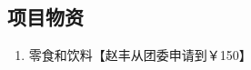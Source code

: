 \documentclass[12pt]{ctexart}
\begin{document}
\begin{appendix}
\section{项目物资}\label{scheduling}
\begin{enumerate}
\item 零食和饮料【赵丰从团委申请到￥150】
\end{enumerate}


\end{appendix}
\end{document}
